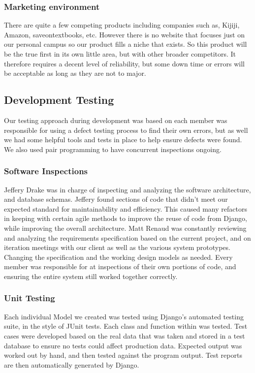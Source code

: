 \documentclass[11pt]{article}
\begin{document}
		\subsubsection{Marketing environment}
			There are quite a few competing products including companies such as, Kijiji, Amazon, saveontextbooks, etc.
			However there is no website that focuses just on our personal campus so our product fills a niche that exists.
			So this product will be the true first in its own little area, but with other broader competitors.
			It therefore requires a decent level of reliability, but some down time or errors will be acceptable as long as they are not to major.

	\subsection{Development Testing}

		Our testing approach during development was based on each member was responsible for using a defect testing process to find their own errors, but as well we had some helpful tools and tests in place to help ensure defects were found. 
		We also used pair programming to have concurrent inspections ongoing.

		\subsubsection{Software Inspections}
			Jeffery Drake was in charge of inspecting and analyzing the software architecture, and database schemas. 
			Jeffery found sections of code that didn't meet our expected standard for maintainability and efficiency. 
			This caused many refactors in keeping with certain agile methods to improve the reuse of code from Django, while improving the overall architecture.  
			Matt Renaud was constantly reviewing and analyzing the requirements specification based on the current project, and on iteration meetings with our client as well as the various system prototypes. 
			Changing the specification and the working design models as needed. 
			Every member was responsible for at inspections of their own portions of code, and ensuring the entire system still worked together correctly.
		\subsubsection{Unit Testing}

			Each individual Model we created was tested using Django's automated testing suite, in the style of JUnit tests. 
			Each class and function within was tested. 
			Test cases were developed based on the real data that was taken and stored in a test database to ensure no tests could affect production data. 
			Expected output was worked out by hand, and then tested against the program output. 
			Test reports are then automatically generated by Django. 
\end{document}
